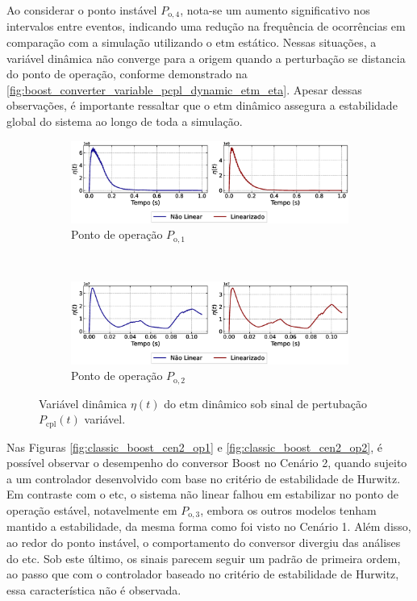 Ao considerar o ponto instável $P_{\mathrm{o}, 4}$, nota-se um aumento significativo nos intervalos entre eventos, indicando uma redução na frequência de ocorrências em comparação com a simulação utilizando o \acrshort{etm} estático. Nessas situações, a variável dinâmica não converge para a origem quando a perturbação se distancia do ponto de operação, conforme demonstrado na \autoref{fig:boost_converter_variable_pcpl_dynamic_etm_eta}. Apesar dessas observações, é importante ressaltar que o \acrshort{etm} dinâmico assegura a estabilidade global do sistema ao longo de toda a simulação.

\begin{figure}[H]
  \centering
  \captionsetup{justification=centering}
  \begin{subfigure}{1.\textwidth}
    \centering
    \includegraphics[width=1.\textwidth]{figuras/dynamic-etm/boost/sim2/op1/eta.eps}
    \caption{Ponto de operação $P_{\mathrm{o}, 1}$}
  \end{subfigure}
  \\[6pt]
  \begin{subfigure}{1.\textwidth}
    \centering
    \includegraphics[width=1.\textwidth]{figuras/dynamic-etm/boost/sim2/op2/eta.eps}
    \caption{Ponto de operação $P_{\mathrm{o}, 2}$}
  \end{subfigure}
  \caption{Variável dinâmica $\eta(t)$ do \acrshort{etm} dinâmico sob sinal de pertubação $P_{\mathrm{cpl}}(t)$ variável.}
  \label{fig:boost_converter_variable_pcpl_dynamic_etm_eta}
\end{figure}

Nas Figuras \ref{fig:classic_boost_cen2_op1} e \ref{fig:classic_boost_cen2_op2}, é possível observar o desempenho do conversor Boost no Cenário 2, quando sujeito a um controlador desenvolvido com base no critério de estabilidade de Hurwitz. Em contraste com o \acrshort{etc}, o sistema não linear falhou em estabilizar no ponto de operação estável, notavelmente em $P_{\mathrm{o}, 3}$, embora os outros modelos tenham mantido a estabilidade, da mesma forma como foi visto no Cenário 1. Além disso, ao redor do ponto instável, o comportamento do conversor divergiu das análises do \acrshort{etc}. Sob este último, os sinais parecem seguir um padrão de primeira ordem, ao passo que com o controlador baseado no critério de estabilidade de Hurwitz, essa característica não é observada.

